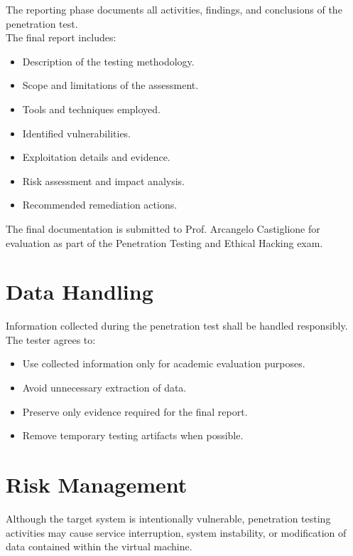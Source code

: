 The reporting phase documents all activities, findings, and conclusions of the
penetration test.
\\

The final report includes:

\begin{itemize}
    \item Description of the testing methodology.
    \item Scope and limitations of the assessment.
    \item Tools and techniques employed.
    \item Identified vulnerabilities.
    \item Exploitation details and evidence.
    \item Risk assessment and impact analysis.
    \item Recommended remediation actions.
\end{itemize}

The final documentation is submitted to Prof. Arcangelo Castiglione for
evaluation as part of the Penetration Testing and Ethical Hacking exam.


\section{Data Handling}

Information collected during the penetration test shall be handled responsibly.
\\

The tester agrees to:

\begin{itemize}
    \item Use collected information only for academic evaluation purposes.
    \item Avoid unnecessary extraction of data.
    \item Preserve only evidence required for the final report.
    \item Remove temporary testing artifacts when possible.
\end{itemize}


\section{Risk Management}

Although the target system is intentionally vulnerable, penetration testing
activities may cause service interruption, system instability, or modification
of data contained within the virtual machine.
\\

